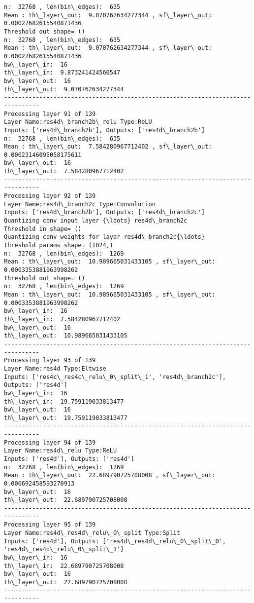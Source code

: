 \documentclass[11pt]{article}
\begin{document}
\begin{Verbatim}[commandchars=\\\{\}]
n:  32768 , len(bin\_edges):  635
Mean : th\_layer\_out:  9.070762634277344 , sf\_layer\_out:  0.00027682615540871436
Threshold out shape= ()
n:  32768 , len(bin\_edges):  635
Mean : th\_layer\_out:  9.070762634277344 , sf\_layer\_out:  0.00027682615540871436
bw\_layer\_in:  16
th\_layer\_in:  9.873241424560547
bw\_layer\_out:  16
th\_layer\_out:  9.070762634277344
--------------------------------------------------------------------------------
Processing layer 91 of 139
Layer Name:res4d\_branch2b\_relu Type:ReLU
Inputs: ['res4d\_branch2b'], Outputs: ['res4d\_branch2b']
n:  32768 , len(bin\_edges):  635
Mean : th\_layer\_out:  7.584280967712402 , sf\_layer\_out:  0.00023146095058175611
bw\_layer\_out:  16
th\_layer\_out:  7.584280967712402
--------------------------------------------------------------------------------
Processing layer 92 of 139
Layer Name:res4d\_branch2c Type:Convolution
Inputs: ['res4d\_branch2b'], Outputs: ['res4d\_branch2c']
Quantizing conv input layer {\ldots} res4d\_branch2c
Threshold in shape= ()
Quantizing conv weights for layer res4d\_branch2c{\ldots}
Threshold params shape= (1024,)
n:  32768 , len(bin\_edges):  1269
Mean : th\_layer\_out:  10.989665031433105 , sf\_layer\_out:  0.0003353881963998262
Threshold out shape= ()
n:  32768 , len(bin\_edges):  1269
Mean : th\_layer\_out:  10.989665031433105 , sf\_layer\_out:  0.0003353881963998262
bw\_layer\_in:  16
th\_layer\_in:  7.584280967712402
bw\_layer\_out:  16
th\_layer\_out:  10.989665031433105
--------------------------------------------------------------------------------
Processing layer 93 of 139
Layer Name:res4d Type:Eltwise
Inputs: ['res4c\_res4c\_relu\_0\_split\_1', 'res4d\_branch2c'], Outputs: ['res4d']
bw\_layer\_in:  16
th\_layer\_in:  19.759119033813477
bw\_layer\_out:  16
th\_layer\_out:  19.759119033813477
--------------------------------------------------------------------------------
Processing layer 94 of 139
Layer Name:res4d\_relu Type:ReLU
Inputs: ['res4d'], Outputs: ['res4d']
n:  32768 , len(bin\_edges):  1269
Mean : th\_layer\_out:  22.689790725708008 , sf\_layer\_out:  0.000692458593270913
bw\_layer\_out:  16
th\_layer\_out:  22.689790725708008
--------------------------------------------------------------------------------
Processing layer 95 of 139
Layer Name:res4d\_res4d\_relu\_0\_split Type:Split
Inputs: ['res4d'], Outputs: ['res4d\_res4d\_relu\_0\_split\_0', 'res4d\_res4d\_relu\_0\_split\_1']
bw\_layer\_in:  16
th\_layer\_in:  22.689790725708008
bw\_layer\_out:  16
th\_layer\_out:  22.689790725708008
--------------------------------------------------------------------------------

\end{Verbatim}
\end{document}
